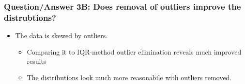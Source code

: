 \documentclass[11pt]{article}
\providecommand{\tightlist}{%
      \setlength{\itemsep}{0pt}\setlength{\parskip}{0pt}}
\begin{document}
    \begin{center}
    \end{center}
    { \hspace*{\fill} \\}
    
    \begin{center}
    \end{center}
    { \hspace*{\fill} \\}
    
    \begin{center}
    \end{center}
    { \hspace*{\fill} \\}
    
    \begin{center}
    \end{center}
    { \hspace*{\fill} \\}
    
    \begin{center}
    \end{center}
    { \hspace*{\fill} \\}
    
    \hypertarget{questionanswer-3b-does-removal-of-outliers-improve-the-distrubtions}{%
\subsubsection{Question/Answer 3B: Does removal of outliers improve the
distrubtions?}\label{questionanswer-3b-does-removal-of-outliers-improve-the-distrubtions}}

\begin{itemize}
\tightlist
\item
  The data is skewed by outliers.

  \begin{itemize}
  \tightlist
  \item
    Comparing it to IQR-method outlier elimination reveals much improved
    results
  \item
    The distributions look much more reasonabile with outliers removed.
  \end{itemize}
\end{itemize}
\end{document}
